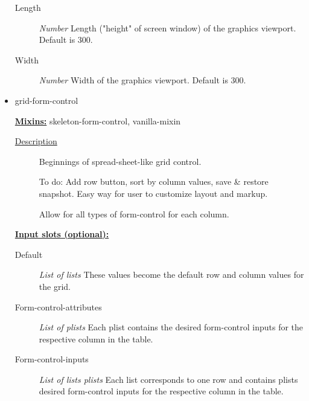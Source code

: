 \documentclass [11pt]{book}
\begin{document}
\begin{itemize}
\begin{description}
\item [Length]
\emph{Number} Length ("height" of screen window) of the graphics viewport. Default is 300.


\item [Width]
\emph{Number} Width of the graphics viewport. Default is 300.


\end{description}







\item {}grid-form-control


\textbf{
\underline{Mixins:}} skeleton-form-control, vanilla-mixin





\begin{description}

\item [
\underline{Description}]


Beginnings of spread-sheet-like 
grid control.

To do: Add row button, sort by column values, 
save & restore snapshot. Easy way for user to 
customize layout and markup.

Allow for all types of form-control for each column.





\end{description}








\textbf{
\underline{Input slots (optional):}}

\begin{description}

\item [Default]
\emph{List of lists} These values become the default row and column
values for the grid.


\item [Form-control-attributes]
\emph{List of plists} Each plist contains the desired form-control
inputs for the respective column in the table.


\item [Form-control-inputs]
\emph{List of lists plists} Each list corresponds to one row
and contains plists desired form-control inputs for the
respective column in the table.



\end{description}
\end{itemize}
\end{document}
